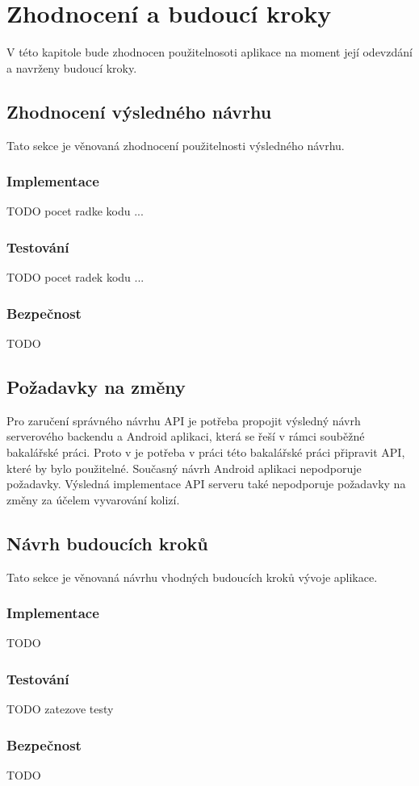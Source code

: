 \chapter{Zhodnocení a budoucí kroky}\label{zhodnocení}
V této kapitole bude zhodnocen použitelnosoti aplikace na moment její odevzdání a navrženy budoucí kroky.
\section{Zhodnocení výsledného návrhu}
    Tato sekce je věnovaná zhodnocení použitelnosti výsledného návrhu. 
    \subsection{Implementace}
        TODO pocet radke kodu ...
    \subsection{Testování}
        TODO pocet radek kodu ...
    \subsection{Bezpečnost}
        TODO
    \section{Požadavky na změny}
        Pro zaručení správného návrhu API je potřeba propojit výsledný návrh serverového backendu a Android aplikaci, která se řeší v rámci souběžné bakalářské práci. Proto v je potřeba v práci této bakalářské práci připravit API, které by bylo použitelné. Současný návrh Android aplikaci nepodporuje požadavky. Výsledná implementace API serveru také nepodporuje požadavky na změny za účelem vyvarování kolizí.

\section{Návrh budoucích kroků}
    Tato sekce je věnovaná návrhu vhodných budoucích kroků vývoje aplikace.
    \subsection{Implementace}
        TODO
    \subsection{Testování}
        TODO zatezove testy
    \subsection{Bezpečnost}
        TODO
